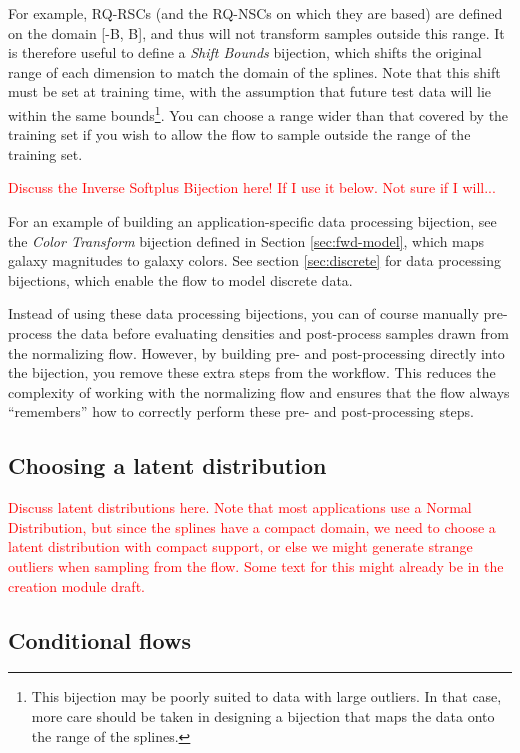 \documentclass[twocolumn]{aastex631}
\newcommand{\note}[1]{\textsf{\textcolor{red}{#1}}}
\begin{document}
For example, RQ-RSCs (and the RQ-NSCs on which they are based) are defined on the domain [-B, B], and thus will not transform samples outside this range.
It is therefore useful to define a \emph{Shift Bounds} bijection, which shifts the original range of each dimension to match the domain of the splines.
Note that this shift must be set at training time, with the assumption that future test data will lie within the same bounds\footnote{This bijection may be poorly suited to data with large outliers. In that case, more care should be taken in designing a bijection that maps the data onto the range of the splines.}.
You can choose a range wider than that covered by the training set if you wish to allow the flow to sample outside the range of the training set.

\note{Discuss the Inverse Softplus Bijection here! If I use it below. Not sure if I will...}

For an example of building an application-specific data processing bijection, see the \emph{Color Transform} bijection defined in Section \ref{sec:fwd-model}, which maps galaxy magnitudes to galaxy colors.
See section \ref{sec:discrete} for data processing bijections, which enable the flow to model discrete data.

Instead of using these data processing bijections, you can of course manually pre-process the data before evaluating densities and post-process samples drawn from the normalizing flow.
However, by building pre- and post-processing directly into the bijection, you remove these extra steps from the workflow.
This reduces the complexity of working with the normalizing flow and ensures that the flow always ``remembers'' how to correctly perform these pre- and post-processing steps.


\subsection{Choosing a latent distribution}

\note{
Discuss latent distributions here.
Note that most applications use a Normal Distribution, but since the splines have a compact domain, we need to choose a latent distribution with compact support, or else we might generate strange outliers when sampling from the flow.
Some text for this might already be in the creation module draft.
}


\subsection{Conditional flows}
\label{sec:conditional}
\end{document}
